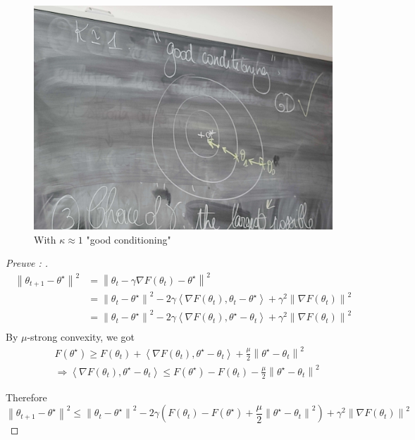 \begin{note}
    \begin{figure}[!htbp]
        \centering
        \includegraphics[width=.5\textwidth]{figs/good_kappa.jpg}
        \caption{With $ \kappa \approx 1 $ "good conditioning" }
    \end{figure}

    \begin{proof}[Preuve : ]
        \begin{align*}
            \left\| \theta _{t+1} - \theta ^\star  \right\| ^2 
                &= \left\| \theta _t - \gamma \nabla F(\theta _t) - \theta ^\star  \right\| ^2 \\
                &= \left\| \theta _t - \theta ^\star  \right\| ^2 - 2 \gamma \left\langle \nabla F (\theta _t), \theta _t - \theta ^\star  \right\rangle + \gamma ^2 \left\| \nabla F(\theta _t) \right\| ^2 \\
                &= \left\| \theta _t - \theta ^\star  \right\| ^2 - 2 \gamma \left\langle \nabla F (\theta _t), \theta ^\star - \theta _t \right\rangle + \gamma ^2 \left\| \nabla F(\theta _t) \right\| ^2 \\
        \end{align*}
        By $ \mu  $-strong convexity, we got 
        \begin{align*}
            &F(\theta ^\star ) \geq F(\theta _t) + \left\langle \nabla F(\theta _t) , \theta ^\star - \theta _t  \right\rangle + \frac{\mu }{2}\left\| \theta ^\star - \theta _t \right\| ^2 \\
            & \Rightarrow \left\langle \nabla F(\theta _t) , \theta ^\star - \theta _t \right\rangle \leq F(\theta ^\star ) - F(\theta _t) - \frac{\mu }{2}\left\| \theta ^\star -  \theta _t \right\| ^2
        \end{align*}
        
        Therefore $\left\| \theta_{t+1} - \theta^{\star }  \right\|^2 \leq \left\| \theta_t - \theta^{\star }\right\|^2 - 2 \gamma (F(\theta_t) - F(\theta ^{\star }) + \dfrac{\mu}{2} \left\| \theta ^{\star } - \theta_t \right\|^2 ) + \gamma ^2 \left\| \nabla F(\theta_t ) \right\|^2    $


\end{proof}
\end{note}
